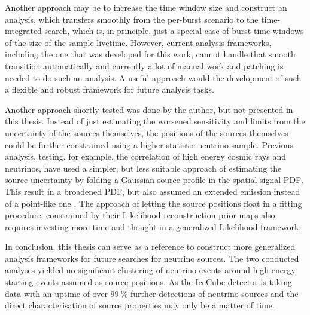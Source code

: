 Another approach may be to increase the time window size and construct an analysis, which transfers smoothly from the per-burst scenario to the time-integrated search, which is, in principle, just a special case of burst time-windows of the size of the sample livetime.
However, current analysis frameworks, including the one that was developed for this work, cannot handle that smooth transition automatically and currently a lot of manual work and patching is needed to do such an analysis.
A useful approach would the development of such a flexible and robust framework for future analysis tasks.

Another approach shortly tested was done by the author, but not presented in this thesis.
Instead of just estimating the worsened sensitivity and limits from the uncertainty of the sources themselves, the positions of the sources themselves could be further constrained using a higher statistic neutrino sample.
Previous analysis, testing, for example, the correlation of high energy cosmic rays and neutrinos, have used a simpler, but less suitable approach of estimating the source uncertainty by folding a Gaussian source profile in the spatial signal PDF.
This result in a broadened PDF, but also assumed an extended emission instead of a point-like one \cite{Aartsen:2015dml}.
The approach of letting the source positions float in a fitting procedure, constrained by their Likelihood reconstruction prior maps also requires investing more time and thought in a generalized Likelihood framework.

In conclusion, this thesis can serve as a reference to construct more generalized analysis frameworks for future searches for neutrino sources.
The two conducted analyses yielded no significant clustering of neutrino events around high energy starting events assumed as source positions.
As the IceCube detector is taking data with an uptime of over $\SI{99}{\percent}$ further detections of neutrino sources and the direct characterisation of source properties may only be a matter of time.


